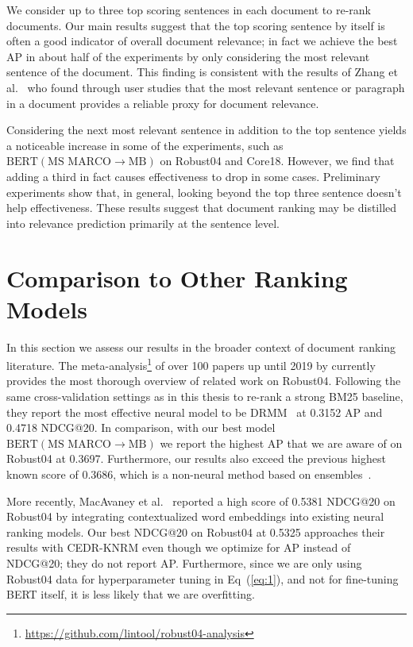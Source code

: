 We consider up to three top scoring sentences in each document to re-rank documents.
Our main results suggest that the top scoring sentence by itself is often a good indicator of overall document relevance; in fact we achieve the best AP in about half of the experiments by only considering the most relevant sentence of the document.
This finding is consistent with the results of Zhang et al.~\cite{zhang2018effective} who found through user studies that the most relevant sentence or paragraph in a document provides a reliable proxy for document relevance.

Considering the next most relevant sentence in addition to the top sentence yields a noticeable increase in some of the experiments, such as $ \textrm{BERT}(\textrm{MS MARCO}\rightarrow\textrm{MB}) $ on Robust04 and Core18.
However, we find that adding a third in fact causes effectiveness to drop in some cases.
Preliminary experiments show that, in general, looking beyond the top three sentence doesn't help effectiveness.
These results suggest that document ranking may be distilled into relevance prediction primarily at the sentence level.


\section{Comparison to Other Ranking Models}

In this section we assess our results in the broader context of document ranking literature.
The meta-analysis\footnote{\url{https://github.com/lintool/robust04-analysis}} of over 100 papers up until 2019 by \cite{Yang_etal_SIGIR2019} currently provides the most thorough overview of related work on Robust04.
Following the same cross-validation settings as in this thesis to re-rank a strong BM25 baseline, they report the most effective neural model to be DRMM~\cite{guo2016deep} at 0.3152 AP and 0.4718 NDCG@20.
In comparison, with our best model $ \textrm{BERT}(\textrm{MS MARCO}\rightarrow\textrm{MB}) $ we report the highest AP that we are aware of on Robust04 at 0.3697.
Furthermore, our results also exceed the previous highest known score of 0.3686, which is a non-neural method based on ensembles~\cite{Cormack:2009:RRF:1571941.1572114}.

More recently, MacAvaney et al.~\cite{MacAvaney_etal_SIGIR2019} reported a high score of 0.5381 NDCG@20 on Robust04 by integrating contextualized word embeddings into existing neural ranking models.
Our best NDCG@20 on \mbox{Robust04} at 0.5325 approaches their results with CEDR-KNRM even though we optimize for AP instead of NDCG@20; they do not report AP.
Furthermore, since we are only using Robust04 data for hyperparameter tuning in Eq~(\ref{eq:1}), and not for fine-tuning BERT itself, it is less likely that we are overfitting.

